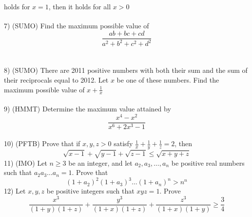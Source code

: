 \documentclass{article}
\begin{document}
holds for $x=1$, then it holds for all $x>0$
\\
\\
7) (SUMO) Find the maximum possible value of
\begin{equation*}
\frac{ab+bc+cd}{a^2+b^2+c^2+d^2}
\end{equation*}
\\
\\
8) (SUMO) There are 2011 positive numbers with both their sum and the sum of their reciprocals equal to 2012. Let $x$ be one of these numbers. Find the maximum possible value of $x+\frac{1}{x}$
\\
\\
9) (HMMT) Determine the maximum value attained by
\begin{equation*}
\frac{x^4-x^2}{x^6+2x^3-1}
\end{equation*}
\\
10) (PFTB) Prove that if $x,y,z>0$ satisfy $\frac{1}{x}+\frac{1}{y}+\frac{1}{z}=2$, then
\begin{equation*}
\sqrt{x-1}+\sqrt{y-1}+\sqrt{z-1}\le \sqrt{x+y+z}
\end{equation*}
11) (IMO) Let $n\ge 3$ be an integer, and let $a_2,a_3,\ldots,a_n$ be positive real numbers such that $a_2a_3\ldots a_n=1$. Prove that
\begin{equation*}
(1+a_2)^2(1+a_3)^3\ldots (1+a_n)^n > n^n
\end{equation*}
12) Let $x,y,z$ be positive integers such that $xyz=1$. Prove
\begin{equation*}
\frac{x^3}{(1+y)(1+z)}+\frac{y^3}{(1+x)(1+z)}+\frac{z^3}{(1+x)(1+y)}\ge \frac{3}{4}
\end{equation*}
\end{document}
